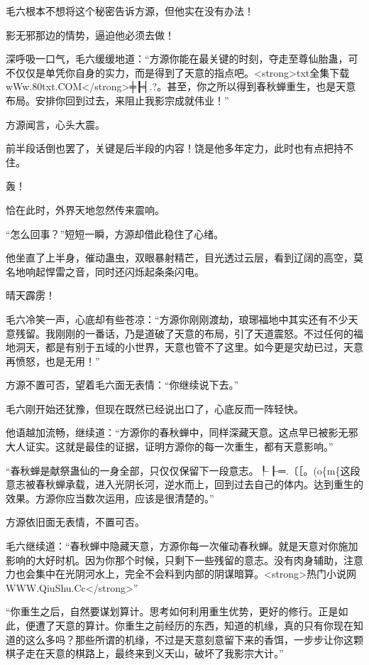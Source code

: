 
\begin{this_body}

毛六根本不想将这个秘密告诉方源，但他实在没有办法！

影无邪那边的情势，逼迫他必须去做！

深呼吸一口气，毛六缓缓地道：“方源你能在最关键的时刻，夺走至尊仙胎蛊，可不仅仅是单凭你自身的实力，而是得到了天意的指点吧。<strong>txt全集下载wWw.80txt.COM</strong>╪┠╡.?。甚至，你之所以得到春秋蝉重生，也是天意布局。安排你回到过去，来阻止我影宗成就伟业！”

方源闻言，心头大震。

前半段话倒也罢了，关键是后半段的内容！饶是他多年定力，此时也有点把持不住。

轰！

恰在此时，外界天地忽然传来震响。

“怎么回事？”短短一瞬，方源却借此稳住了心绪。

他坐直了上半身，催动蛊虫，双眼暴射精芒，目光透过云层，看到辽阔的高空，莫名地响起悍雷之音，同时还闪烁起条条闪电。

晴天霹雳！

毛六冷笑一声，心底却有些苍凉：“方源你刚刚渡劫，琅琊福地中其实还有不少天意残留。我刚刚的一番话，乃是道破了天意的布局，引了天道震怒。不过任何的福地洞天，都是有别于五域的小世界，天意也管不了这里。如今更是灾劫已过，天意再愤怒，也是无用！”

方源不置可否，望着毛六面无表情：“你继续说下去。”

毛六刚开始还犹豫，但现在既然已经说出口了，心底反而一阵轻快。

他语越加流畅，继续道：“方源你的春秋蝉中，同样深藏天意。这点早已被影无邪大人证实。这就是最佳的证据，证明方源你的每一次重生，都有天意影响。”

“春秋蝉是献祭蛊仙的一身全部，只仅仅保留下一段意志。┞┠═.〔［。(o\{m\{这段意志被春秋蝉承载，进入光阴长河，逆水而上，回到过去自己的体内。达到重生的效果。方源你应当数次运用，应该是很清楚的。”

方源依旧面无表情，不置可否。

毛六继续道：“春秋蝉中隐藏天意，方源你每一次催动春秋蝉。就是天意对你施加影响的大好时机。因为你那个时候，只剩下一些残留的意志。没有肉身辅助，注意力也会集中在光阴河水上，完全不会料到内部的阴谋暗算。<strong>热门小说网WWW.QiuShu.Cc</strong>”

“你重生之后，自然要谋划算计。思考如何利用重生优势，更好的修行。正是如此，便遭了天意的算计。你重生之前经历的东西，知道的机缘，真的只有你现在知道的这么多吗？那些所谓的机缘，不过是天意刻意留下来的香饵，一步步让你这颗棋子走在天意的棋路上，最终来到义天山，破坏了我影宗大计。”


\end{this_body}

